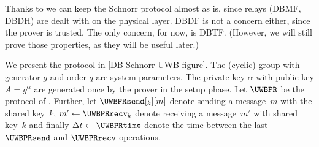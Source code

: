 Thanks to \textcite{UWBPR} we can keep the Schnorr protocol almost as is, since 
relays (\ac{DBMF}, \ac{DBDH}) are dealt with on the physical layer.
\Ac{DBDF} is not a concern either, since the prover is trusted.
The only concern, for now, is \acl{DBTF}.
(However, we will still prove those properties, as they will be useful later.)

We present the protocol in \cref{DB-Schnorr-UWB-figure}.
The (cyclic) group with generator \(g\) and order \(q\) are system parameters.
The private key \(\alpha\) with public key \(A = g^\alpha\) are generated once by the prover in the setup phase.
Let \(\UWBPR\) be the protocol of \textcite{UWBPR}.
Further, let
\(\UWBPRsend[_k][m]\) denote sending a message~\(m\) with the shared key~\(k\),
\(m'\gets \UWBPRrecv_k\) denote receiving a message~\(m'\) with shared 
key~\(k\) and finally
\(\Delta t\gets \UWBPRtime\) denote the time between the last \(\UWBPRsend\) 
and \(\UWBPRrecv\) operations.

